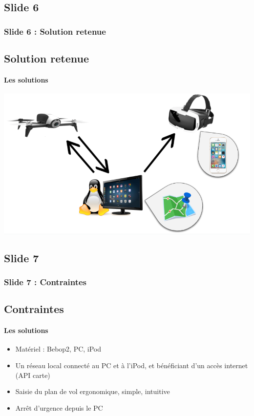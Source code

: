 \documentclass{beamer}
\begin{document}
		
	\begin{frame}
	\section{Slide 6}
		\begin{center}
		\frametitle{Slide 6 : Solution retenue}
		\subsection{Solution retenue}
        \framesubtitle{Les solutions}
            \includegraphics[scale=0.65]{shcema_archi.png}
		\end{center}
	\end{frame}
	
	\begin{frame}
	\section{Slide 7}
		\begin{center}
		\frametitle{Slide 7 : Contraintes}
		\subsection{Contraintes}
        \framesubtitle{Les solutions}
            \begin{itemize}
                \item Matériel : Bebop2, PC, iPod
                \item Un réseau local connecté au PC et à l'iPod, et bénéficiant d'un accès internet (API carte)
                \item Saisie du plan de vol ergonomique, simple, intuitive
                \item Arrêt d'urgence depuis le PC
            \end{itemize}
		\end{center}
	\end{frame}

	
\end{document}
